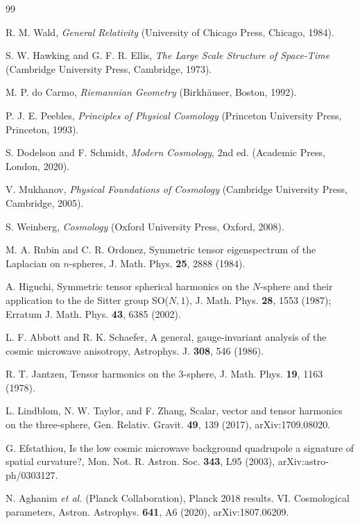 \documentclass[
  aps,
  prd,
  reprint,
  superscriptaddress,
  nofootinbib,
  floatfix,
  longbibliography
]{revtex4-2}
\theoremstyle{plain}
\theoremstyle{definition}
\theoremstyle{remark}
\begin{document}
\sloppy
\begin{thebibliography}{99}

R. M. Wald, \textit{General Relativity} (University of Chicago Press, Chicago, 1984).

S. W. Hawking and G. F. R. Ellis, \textit{The Large Scale Structure of Space-Time}
(Cambridge University Press, Cambridge, 1973).

M. P. do Carmo, \textit{Riemannian Geometry} (Birkh\"auser, Boston, 1992).

P. J. E. Peebles, \textit{Principles of Physical Cosmology} (Princeton University Press,
Princeton, 1993).

S. Dodelson and F. Schmidt, \textit{Modern Cosmology}, 2nd ed. (Academic Press, London, 2020).

V. Mukhanov, \textit{Physical Foundations of Cosmology} (Cambridge University Press,
Cambridge, 2005).

S. Weinberg, \textit{Cosmology} (Oxford University Press, Oxford, 2008).

M. A. Rubin and C. R. Ordonez, Symmetric tensor eigenspectrum of the Laplacian on
$n$-spheres, J. Math. Phys. \textbf{25}, 2888 (1984).


A. Higuchi, Symmetric tensor spherical harmonics on the $N$-sphere and their application
to the de Sitter group SO($N,1$), J. Math. Phys. \textbf{28}, 1553 (1987);
Erratum J. Math. Phys. \textbf{43}, 6385 (2002).

L. F. Abbott and R. K. Schaefer, A general, gauge-invariant analysis of the cosmic
microwave anisotropy, Astrophys. J. \textbf{308}, 546 (1986).

R. T. Jantzen, Tensor harmonics on the 3-sphere, J. Math. Phys. \textbf{19}, 1163 (1978).

L. Lindblom, N. W. Taylor, and F. Zhang, Scalar, vector and tensor harmonics on the
three-sphere, Gen. Relativ. Gravit. \textbf{49}, 139 (2017), arXiv:1709.08020.

G. Efstathiou, Is the low cosmic microwave background quadrupole a signature of spatial
curvature?, Mon. Not. R. Astron. Soc. \textbf{343}, L95 (2003), arXiv:astro-ph/0303127.

N. Aghanim \textit{et al.} (Planck Collaboration), Planck 2018 results. VI. Cosmological
parameters, Astron. Astrophys. \textbf{641}, A6 (2020), arXiv:1807.06209.


\end{thebibliography}
\end{document}
